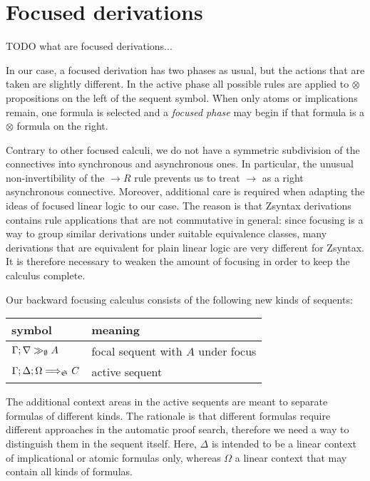 \section{Focused derivations}

TODO what are focused derivations...

In our case, a focused derivation has two phases as usual, but the actions that
are taken are slightly different. In the active phase all possible rules are
applied to $\otimes$ propositions on the left of the sequent symbol. When only
atoms or implications remain, one formula is selected and a \emph{focused phase}
may begin if that formula is a $\otimes$ formula on the right.

Contrary to other focused calculi, we do not have a symmetric subdivision of the
connectives into synchronous and asynchronous ones. In particular, the unusual
non-invertibility of the $\rightarrow R$ rule prevents us to treat $\rightarrow$
as a right asynchronous connective. Moreover, additional care is required when
adapting the ideas of focused linear logic to our case. The reason is that
Zsyntax derivations contains rule applications that are not commutative in
general: since focusing is a way to group similar derivations under suitable
equivalence classes, many derivations that are equivalent for plain linear logic
are very different for Zsyntax. It is therefore necessary to weaken the amount
of focusing in order to keep the calculus complete.

Our backward focusing calculus consists of the following new kinds of sequents:

\begin{table}[h]
  \centering
  \begin{tabular}{|l|l|}
    \hline
    \textbf{symbol} & \textbf{meaning} \\
    \hline
    $\Gamma; \nabla \gg_{\emptyset} A$ & focal sequent with $A$ under focus \\
    $\Gamma; \Delta; \Omega \Longrightarrow_{\mathfrak{S}_{}} C$ & active sequent \\
    \hline
  \end{tabular}
\end{table}

The additional context areas in the active sequents are meant to separate
formulas of different kinds. The rationale is that different formulas require
different approaches in the automatic proof search, therefore we need a way to
distinguish them in the sequent itself. Here, $\Delta$ is intended to be a
linear context of implicational or atomic formulas only, whereas $\Omega$ a
linear context that may contain all kinds of formulas.

